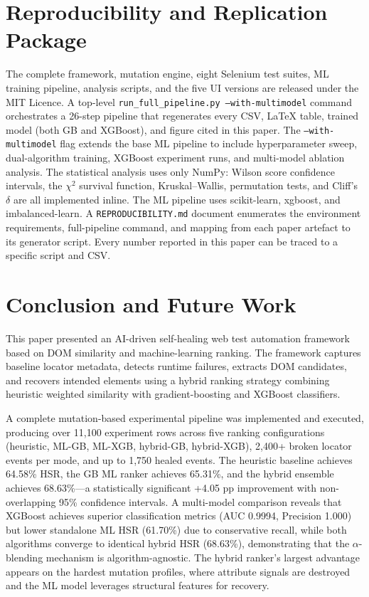 \documentclass[12pt]{article}
\begin{document}
\section{Reproducibility and Replication Package}
\label{sec:reproducibility}

The complete framework, mutation engine, eight Selenium test suites, ML training pipeline, analysis scripts, and the five UI versions are released under the MIT Licence. A top-level \texttt{run\_full\_pipeline.py --with-multimodel} command orchestrates a 26-step pipeline that regenerates every CSV, LaTeX table, trained model (both GB and XGBoost), and figure cited in this paper. The \texttt{--with-multimodel} flag extends the base ML pipeline to include hyperparameter sweep, dual-algorithm training, XGBoost experiment runs, and multi-model ablation analysis. The statistical analysis uses only NumPy: Wilson score confidence intervals, the $\chi^2$ survival function, Kruskal--Wallis, permutation tests, and Cliff's $\delta$ are all implemented inline. The ML pipeline uses scikit-learn, xgboost, and imbalanced-learn. A \texttt{REPRODUCIBILITY.md} document enumerates the environment requirements, full-pipeline command, and mapping from each paper artefact to its generator script. Every number reported in this paper can be traced to a specific script and CSV.

\section{Conclusion and Future Work}
\label{sec:conclusion}

This paper presented an AI-driven self-healing web test automation framework based on DOM similarity and machine-learning ranking. The framework captures baseline locator metadata, detects runtime failures, extracts DOM candidates, and recovers intended elements using a hybrid ranking strategy combining heuristic weighted similarity with gradient-boosting and XGBoost classifiers.

A complete mutation-based experimental pipeline was implemented and executed, producing over 11,100 experiment rows across five ranking configurations (heuristic, ML-GB, ML-XGB, hybrid-GB, hybrid-XGB), 2,400+ broken locator events per mode, and up to 1,750 healed events. The heuristic baseline achieves 64.58\% HSR, the GB ML ranker achieves 65.31\%, and the hybrid ensemble achieves 68.63\%---a statistically significant +4.05 pp improvement with non-overlapping 95\% confidence intervals. A multi-model comparison reveals that XGBoost achieves superior classification metrics (AUC 0.9994, Precision 1.000) but lower standalone ML HSR (61.70\%) due to conservative recall, while both algorithms converge to identical hybrid HSR (68.63\%), demonstrating that the $\alpha$-blending mechanism is algorithm-agnostic. The hybrid ranker's largest advantage appears on the hardest mutation profiles, where attribute signals are destroyed and the ML model leverages structural features for recovery.
\end{document}
